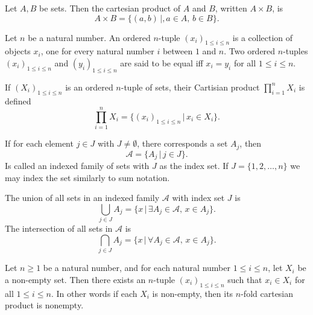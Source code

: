 \documentclass{article}
\begin{document}
\begin{definition}
	Let \(A,B\) be sets. Then the cartesian product of \(A\) and \(B\), written \(A\times B\), is
	\begin{equation*}
		A\times B=\{(a,b)\,|,a\in A,\,b\in B\}.
	\end{equation*}
\end{definition}
\begin{definition}
	Let \(n\) be a natural number. An ordered \(n\)-tuple \((x_i)_{1\leq i\leq n}\) is a collection of objects \(x_i\), one for every natural number \(i\) between \(1\) and \(n\). Two ordered \(n\)-tuples \((x_i)_{1\leq i\leq n}\) and \((y_i)_{1\leq i\leq n}\) are said to be equal iff \(x_i=y_i\) for all \(1\leq i\leq n\).
\end{definition}
\begin{definition}
	If \((X_i)_{1\leq i\leq n}\) is an ordered \(n\)-tuple of sets, their Cartisian product \(\prod_{i=1}^{n}X_i\) is defined
	\begin{equation*}
		\prod_{i=1}^n X_i=\{(x_i)_{1\leq i\leq n}\,|\, x_i\in X_i\}.
	\end{equation*}
\end{definition}
\begin{definition}
	If for each element \(j\in J\) with \(J\neq\emptyset\), there corresponds a set \(A_j\), then
	\begin{equation*}
		\mathscr{A}=\{A_j\,|\,j\in J\}.
	\end{equation*}
	Is called an indexed family of sets with \(J\) as the index set. If \(J=\{1,2,\ldots,n\}\) we may index the set similarly to sum notation.
\end{definition}
\begin{definition}
	The union of all sets in an indexed family \(\mathscr{A}\) with index set \(J\) is
	\begin{equation*}
		\bigcup_{j\in J}A_j=\{x\,|\,\exists A_j\in\mathscr{A},\,x\in A_j\}.
	\end{equation*}
	The intersection of all sets in \(\mathscr{A}\) is
	\begin{equation*}
		\bigcap_{j\in J}A_j=\{x\,|\,\forall A_j\in\mathscr{A},\,x\in A_j\}.
	\end{equation*}
\end{definition}
\begin{lemma}
	Let \(n\geq 1\) be a natural number, and for each natural number \(1\leq i\leq n\), let \(X_i\) be a non-empty set. Then there exists an \(n\)-tuple \((x_i)_{1\leq i\leq n}\) such that \(x_i\in X_i\) for all \(1\leq i\leq n\). In other words if each \(X_i\) is non-empty, then its \(n\)-fold cartesian product is nonempty.
\end{lemma}
\end{document}
